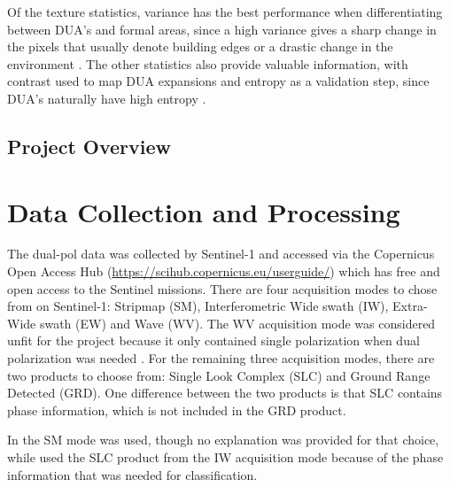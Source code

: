 \documentclass[conference]{IEEEtran}
\begin{document}
		Of the texture statistics, variance has the best performance when differentiating between DUA's and formal areas, since a high variance gives a sharp change in the pixels that usually denote building edges or a drastic change in the environment \cite{Kuffer_2015}.
		The other statistics also provide valuable information, with contrast used to map DUA expansions and entropy as a validation step, since DUA's naturally have high entropy \cite{Kuffer_2016}.
		
	\subsection{Project Overview}


	\section{Data Collection and Processing}
	The dual-pol data was collected by Sentinel-1 and accessed via the Copernicus Open Access Hub (\url{https://scihub.copernicus.eu/userguide/}) which has free and open access to the Sentinel missions.
	There are four acquisition modes to chose from on Sentinel-1: Stripmap (SM), Interferometric Wide swath (IW), Extra-Wide swath (EW) and Wave (WV).
	The WV acquisition mode was considered unfit for the project because it only contained single polarization when dual polarization was needed \cite{acq_modes}.
	For the remaining three acquisition modes, there are two products to choose from: Single Look Complex (SLC) and Ground Range Detected (GRD).
	One difference between the two products is that SLC contains phase information, which is not included in the GRD product.
	
	In \cite{Wurm_2017} the SM mode was used, though no explanation was provided for that choice, while \cite{Hu_2018} used the SLC product from the IW acquisition mode because of the phase information that was needed for classification.

	
\end{document}
